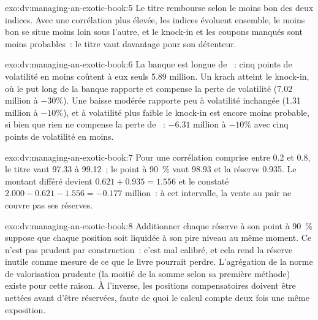 \begin{solution}{exo:dv:managing-an-exotic-book:5}
Le titre rembourse selon le moins bon des deux indices. Avec une corrélation plus élevée, les indices évoluent ensemble, le moins bon se situe moins loin sous l'autre, et le knock-in et les
coupons manqués sont moins probables~: le titre vaut davantage pour son détenteur.
\end{solution}

\begin{solution}{exo:dv:managing-an-exotic-book:6}
La banque est longue de ~: cinq points de volatilité en moins coûtent à eux seuls 5.89 million. Un krach atteint le knock-in, où le put long de la banque rapporte et compense la perte de volatilité
(7.02 million à $-30\%$). Une baisse modérée rapporte peu à volatilité inchangée (1.31 million à $-10\%$), et à volatilité plus faible le knock-in est encore moins probable, si bien que
rien ne compense la perte de ~: $-6.31$ million à $-10\%$ avec cinq points de volatilité en moins.
\end{solution}

\begin{solution}{exo:dv:managing-an-exotic-book:7}
Pour une corrélation comprise entre 0.2 et 0.8, le titre vaut 97.33 à 99.12~; le point à 90~\% vaut 98.93 et la réserve 0.935. Le montant différé devient $0.621+0.935=1.556$ et le
 constaté $2.000-0.621-1.556=-0.177$ million~: à cet intervalle, la vente au pair ne couvre pas ses réserves.
\end{solution}

\begin{solution}{exo:dv:managing-an-exotic-book:8}
Additionner chaque réserve à son point à 90~\% suppose que chaque position soit liquidée à son pire niveau au même moment. Ce n'est pas prudent par construction~: c'est mal calibré, et cela rend
la réserve inutile comme mesure de ce que le livre pourrait perdre. L'agrégation de la norme de valorisation prudente (la moitié de la somme selon sa première méthode) existe pour cette
raison. À l'inverse, les positions compensatoires doivent être nettées avant d'être réservées, faute de quoi le calcul compte deux fois une même exposition.
\end{solution}

